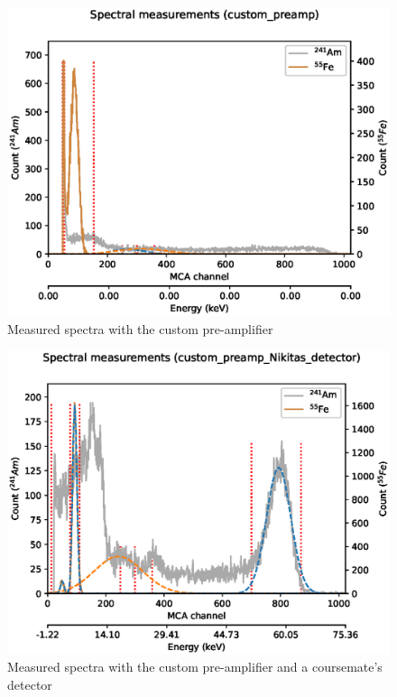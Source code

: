 \documentclass[a4paper]{article}
\begin{document}
\begin{appendices}
\begin{figure}[ht!]
\centering
\includegraphics[width=\textwidth]{fig/python/spectra_custom_preamp}
\caption{Measured spectra with the custom pre-amplifier}
\label{fig:pre_amp_testing}
\end{figure}

\begin{figure}[ht!]
\centering
\includegraphics[width=\textwidth]{fig/python/spectra_custom_preamp_Nikitas_detector}
\caption{Measured spectra with the custom pre-amplifier and a coursemate's detector}
\label{fig:pre_amp_testing_nikita}
\end{figure}




\end{appendices}
\end{document}
